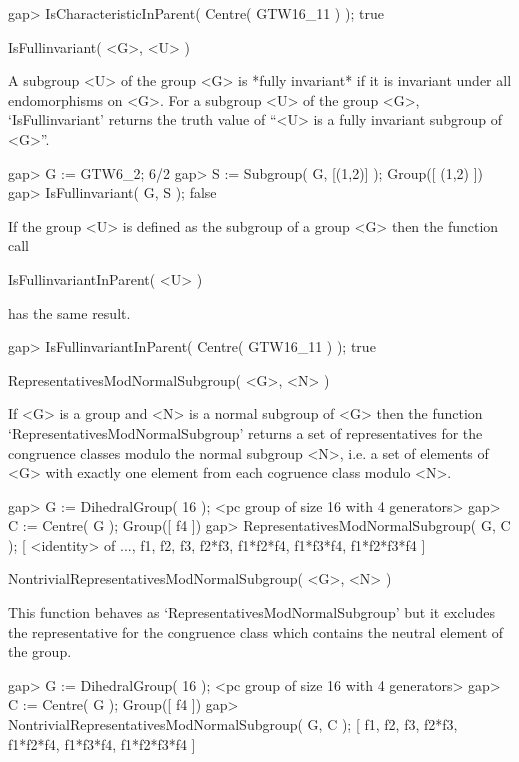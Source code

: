 \beginexample
    gap> IsCharacteristicInParent( Centre( GTW16_11 ) );
    true
\endexample

\>IsFullinvariant( <G>, <U> )

A subgroup <U> of the group <G> is *fully invariant* if it is invariant under
all endomorphisms on <G>. 
For a subgroup <U> of the group <G>, `IsFullinvariant' returns the
truth value of ``<U> is a fully invariant subgroup of <G>''.

\beginexample
    gap> G := GTW6_2;
    6/2
    gap> S := Subgroup( G, [(1,2)] );                                
    Group([ (1,2) ])
    gap> IsFullinvariant( G, S );
    false
\endexample

If the group <U> is defined as the subgroup of a group <G> then the function
call

\>IsFullinvariantInParent( <U> )

has the same result.

\beginexample
    gap> IsFullinvariantInParent( Centre( GTW16_11 ) );
    true
\endexample



\>RepresentativesModNormalSubgroup( <G>, <N> )

If <G> is a group and <N> is a normal subgroup of <G> then the function
`RepresentativesModNormalSubgroup' returns a set of representatives for
the congruence classes modulo the normal subgroup <N>, i.e. a set of elements
of <G> with exactly one element from each cogruence class modulo <N>.

\beginexample
    gap> G := DihedralGroup( 16 );
    <pc group of size 16 with 4 generators>
    gap> C := Centre( G );
    Group([ f4 ])
    gap> RepresentativesModNormalSubgroup( G, C );
    [ <identity> of ..., f1, f2, f3, f2*f3, f1*f2*f4, f1*f3*f4, 
      f1*f2*f3*f4 ]
\endexample

\>NontrivialRepresentativesModNormalSubgroup( <G>, <N> )

This function behaves as `RepresentativesModNormalSubgroup' but it excludes
the representative for the congruence class which contains the neutral element
of the group.

\beginexample
    gap> G := DihedralGroup( 16 );
    <pc group of size 16 with 4 generators>
    gap> C := Centre( G );
    Group([ f4 ])
    gap> NontrivialRepresentativesModNormalSubgroup( G, C );
    [ f1, f2, f3, f2*f3, f1*f2*f4, f1*f3*f4, f1*f2*f3*f4 ]
\endexample

